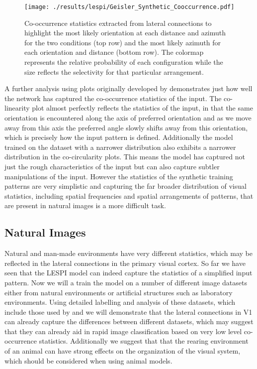 \begin{figure}
	\centering
    \texttt{[image: ./results/lespi/Geisler\_Synthetic\_Cooccurrence.pdf]}
	\caption{Co-occurrence statistics extracted from lateral
      connections to highlight the most likely orientation at each
      distance and azimuth for the two conditions (top row) and the
      most likely azimuth for each orientation and distance (bottom
      row). The colormap represents the relative probability of each
      configuration while the size reflects the selectivity for that
      particular arrangement.}
	\label{SyntheticGeisler}
\end{figure}

A further analysis using plots originally developed by
\cite{Geisler2001} demonstrates just how well the network has captured
the co-occurrence statistics of the input. The co-linearity plot
almost perfectly reflects the statistics of the input, in that the
same orientation is encountered along the axis of preferred
orientation and as we move away from this axis the preferred angle
slowly shifts away from this orientation, which is precisely how the
input pattern is defined. Additionally the model trained on the
dataset with a narrower distribution also exhibits a narrower
distribution in the co-circularity plots. This means the model has
captured not just the rough characteristics of the input but can also
capture subtler manipulations of the input. However the statistics of
the synthetic training patterns are very simplistic and capturing the
far broader distribution of visual statistics, including spatial
frequencies and spatial arrangements of patterns, that are present in
natural images is a more difficult task.

\subsection{Natural Images}

Natural and man-made environments have very different statistics,
which may be reflected in the lateral connections in the primary
visual cortex. So far we have seen that the LESPI model can indeed
capture the statistics of a simplified input pattern. Now we will a
train the model on a number of different image datasets either from
natural environments or artificial structures such as laboratory
environments. Using detailed labelling and analysis of these datasets,
which include those used by \citep{Perrinet2015} and \citep{Serre2007}
we will demonstrate that the lateral connections in V1 can already
capture the differences between different datasets, which may suggest
that they can already aid in rapid image classification based on very
low level co-occurrence statistics. Additionally we suggest that that
the rearing environment of an animal can have strong effects on the
organization of the visual system, which should be considered when
using animal models.

